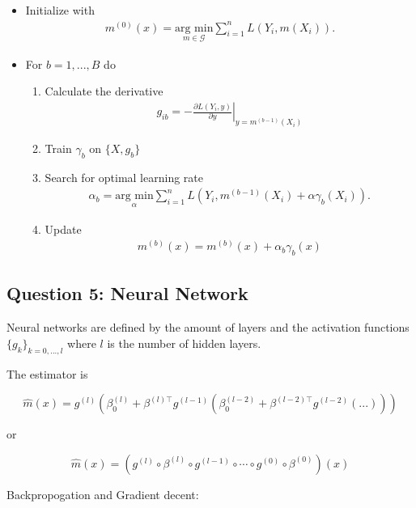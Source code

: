 \documentclass[a4paper,12pt,openany]{book}
\providecommand{\tightlist}{%
 \setlength{\itemsep}{0pt}\setlength{\parskip}{0pt}}
\begin{document}
\begin{itemize}
\tightlist
\item
  Initialize with
  \begin{align*}
    m^{(0)}(x)=\underset{m\in \mathcal G}{\text{arg min}}\sum_{i=1}^n L(Y_i,m(X_i)).
    \end{align*}
\item
  For \(b= 1,..., B\) do

  \begin{enumerate}
  \def\labelenumi{(\alph{enumi})}
  \tightlist
  \item
    Calculate the derivative
    \begin{align*}
    g_{ib}=-\left.\frac{\partial L(Y_i,y)}{\partial y}\right\vert_{y=m^{(b-1)}(X_i)}
    \end{align*}
  \item
    Train \(\gamma_b\) on \(\{X,g_b\}\)
  \item
    Search for optimal learning rate
    \begin{align*}
    \alpha_b=\underset{\alpha}{\text{arg min}}\sum_{i=1}^n L(Y_i,m^{(b-1)}(X_i) +\alpha\gamma_b(X_i)).
    \end{align*}
  \item
    Update
    \begin{align*}
    m^{(b)}(x)=m^{(b)}(x) + \alpha_b\gamma_b(x)
    \end{align*}
  \end{enumerate}
\end{itemize}

\hypertarget{question-5-neural-network}{%
\subsection{Question 5: Neural Network}\label{question-5-neural-network}}

Neural networks are defined by the amount of layers and the activation functions \(\{g_k\}_{k=0,...,l}\) where \(l\) is the number of hidden layers.

The estimator is

\[
\hat m(x)=g^{(l)}\left(\beta^{(l)}_0+\beta^{(l)\top}g^{(l-1)}\left(\beta^{(l-2)}_0+\beta^{(l-2)\top}g^{(l-2)}\left(...\right)\right) \right)
\]

or

\[
\hat m (x)=\left(g^{(l)}\circ \beta^{(l)}\circ g^{(l-1)}\circ \cdots \circ g^{(0)} \circ\beta^{(0)}\right)(x)
\]

Backpropogation and Gradient decent:
\end{document}

